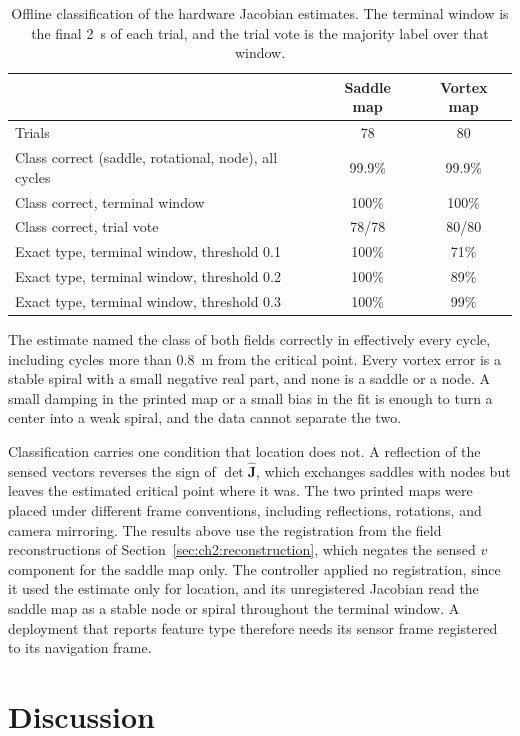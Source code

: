 \begin{table}[htbp]
\centering
\caption{Offline classification of the hardware Jacobian estimates.
The terminal window is the final 2~s of each trial, and the trial vote is
the majority label over that window.}
\label{tab:ch6:classification_hw}
\begin{tabular}{lcc}
\hline
 & Saddle map & Vortex map \\
\hline
Trials & 78 & 80 \\
Class correct (saddle, rotational, node), all cycles & 99.9\% & 99.9\% \\
Class correct, terminal window & 100\% & 100\% \\
Class correct, trial vote & 78/78 & 80/80 \\
Exact type, terminal window, threshold 0.1 & 100\% & 71\% \\
Exact type, terminal window, threshold 0.2 & 100\% & 89\% \\
Exact type, terminal window, threshold 0.3 & 100\% & 99\% \\
\hline
\end{tabular}
\end{table}

The estimate named the class of both fields correctly in effectively
every cycle, including cycles more than 0.8~m from the critical point.
Every vortex error is a stable spiral with a small negative real part,
and none is a saddle or a node. A small damping in the printed map or a
small bias in the fit is enough to turn a center into a weak spiral, and
the data cannot separate the two.

Classification carries one condition that location does not. A
reflection of the sensed vectors reverses the sign of
$\det\hat{\mathbf{J}}$, which exchanges saddles with nodes but leaves the
estimated critical point where it was. The two printed maps were placed
under different frame conventions, including reflections, rotations, and
camera mirroring. The results above use the registration from the field
reconstructions of Section~\ref{sec:ch2:reconstruction}, which negates
the sensed $v$ component for the saddle map only. The controller applied
no registration, since it used the estimate only for location, and its
unregistered Jacobian read the saddle map as a stable node or spiral
throughout the terminal window. A deployment that reports feature type
therefore needs its sensor frame registered to its navigation frame.

\section{Discussion}
\label{sec:ch6:discussion}

